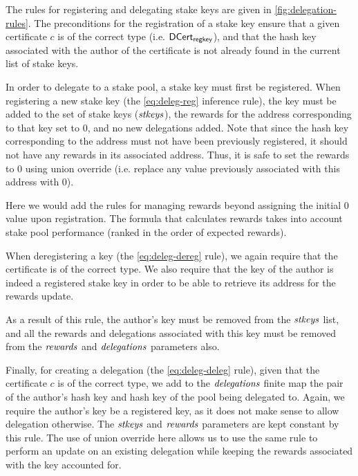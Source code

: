 The rules for registering and delegating stake keys are given in
\cref{fig:delegation-rules}. The preconditions for the registration of a stake
key ensure that a given certificate $c$ is of the correct type
(i.e. $\mathsf{DCert_{regkey}}$),
and that the hash key associated with the author of the certificate is not
already found in the current list of stake keys.

In order to delegate to a stake pool, a stake key must first be registered.
When registering a new stake key (the \cref{eq:deleg-reg} inference rule),
the key must be
added to the set of stake keys ($\mathit{stkeys}$), the rewards for the address
corresponding to that key set to 0, and no new delegations added. Note that
since the hash key corresponding to the address must not have been previously
registered,
it should not have any rewards in its associated address. Thus, it is safe
to set the rewards to 0 using union override (i.e. replace any value previously
associated with this address with 0).

\begin{todo}
Here we would add the rules for managing rewards beyond assigning
the initial 0 value upon registration. The formula that calculates rewards
takes into account stake pool
performance (ranked in the order of expected rewards).
\end{todo}

When deregistering a key (the \cref{eq:deleg-dereg} rule), we again
require that the certificate is of the correct type. We also require
that the key of the author is indeed a registered stake key
in order to be able to retrieve its address for the rewards update.

As a result of this rule, the author's key must be removed from the $\mathit{stkeys}$ list,
and all the rewards and delegations associated with this key must be removed
from the $\mathit{rewards}$ and $\mathit{delegations}$ parameters also.

Finally, for creating a delegation (the \cref{eq:deleg-deleg} rule),
given that the certificate $c$ is of the correct type, we add to the
$\mathit{delegations}$ finite map the pair of
the author's hash key and hash key of the pool being delegated to.
Again, we require the author's key be a registered key, as it does not make
sense to allow delegation otherwise.
The $\mathit{stkeys}$ and $\mathit{rewards}$ parameters are kept constant by
this rule. The use of union override here allows us to use the same rule
to perform an update on an existing delegation while keeping the rewards
associated with the key accounted for.

